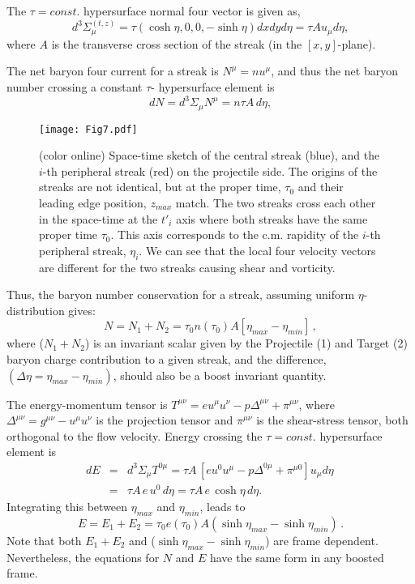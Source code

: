 \documentclass[aps,prc,twocolumn,floatfix,showpacs,a4paper,
nofootinbib,amsmath,amssymb]{revtex4-1}
\newcommand{\be}{\begin{equation}}
\newcommand{\ee}{\end{equation}}
\newcommand{\ba}{\begin{eqnarray}}
\newcommand{\ea}{\end{eqnarray}}
\begin{document}
The $\tau=const.$ hypersurface normal four vector is given as,
\be
d^3\Sigma_{\mu}^{( t,z)}=\tau  \left( \cosh \eta 
,0 ,0,-\sinh \eta\right) dxdy d\eta = \tau A u_\mu d\eta,
\ee
where $A$ is the transverse cross section of the 
streak (in the $[x,y]$-plane).

The net baryon four current for a streak is
$N^\mu = n u^\mu$, and thus the net baryon number crossing 
a constant $\tau$- hypersurface element is
\be
dN = d^3\Sigma_\mu N^\mu =  n \tau A \, d\eta , 
\ee




%
\begin{figure}[ht]     %
\begin{center}
\resizebox{1.01\columnwidth}{!}
{\texttt{[image: Fig7.pdf]}}
\caption{ (color online)
Space-time sketch of the central streak (blue), 
and the $i$-th peripheral streak (red)
on the projectile side. 
The origins of the streaks are not identical, but at the
proper time, $\tau_0$ and their leading edge position, $z_{max}$ match.
The two streaks cross each other in the space-time at the $t'_i$ axis where
both streaks have the same proper time $\tau_0$. 
This axis corresponds to the c.m. rapidity of the $i$-th peripheral
streak, $\eta_i$.
We can see that the
local four velocity vectors are different for the two streaks causing shear
and vorticity.
}
\label{f2}
\end{center}
\end{figure}        %
%




Thus, the baryon number conservation for a streak, 
assuming uniform $\eta$-distribution gives:
\be
N = N_1 + N_2 = \tau_0 n(\tau_0) A \left[\eta_{max} - \eta_{min}\right]\,  ,
\label{Ncons}
\ee
where ($N_1 + N_2$) is an invariant scalar given by the 
Projectile (1) and Target (2) baryon charge contribution to a given streak,
and the 
difference, $(\Delta\eta = \eta_{max} - \eta_{min})$, should also be a 
boost invariant quantity.


The energy-momentum tensor is 
$T^{\mu \nu} = e u^\mu u^\nu - p\Delta^{\mu \nu} + \pi^{\mu \nu}$, where $\Delta^{\mu \nu} = g^{\mu \nu} - u^\mu u^\nu$ is the 
projection tensor and $\pi^{\mu \nu}$ is the
shear-stress tensor, both orthogonal to the flow velocity.
Energy crossing the $\tau=const.$ hypersurface element is 
\ba \nonumber
dE &=& d^3\Sigma_\mu T^{0\mu} 
= \tau A \, [e u^0 u^\mu  - p \Delta^{0\mu} + \pi^{\mu 0}] u_\mu d\eta \,  
\\
&=& \tau A\, e \, u^0 \, d\eta = \tau A\, e\, \cosh \eta\, d\eta .
\ea
Integrating this between $\eta_{max}$ and $\eta_{min}$, leads to
\be
E = E_1 + E_2 = \tau_0 e(\tau_0) A (\sinh \eta_{max} - \sinh \eta_{min}) \, .
\label{E12}
\ee
%
Note that both $E_1 + E_2$ and ($\sinh \eta_{max} - \sinh \eta_{min}$) are 
frame dependent. Nevertheless, the equations for $N$ and $E$ have
the same form in any boosted frame.
\end{document}
